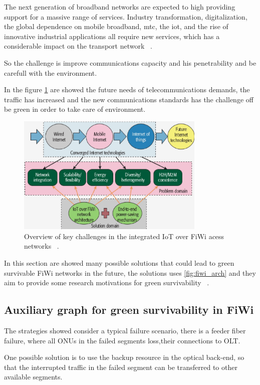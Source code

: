 \documentclass[conference,compsoc]{IEEEtran}
\begin{document}
The next generation of broadband networks are expected to  high providing support for a massive 
range of services. Industry transformation, digitalization, the global dependence on mobile 
broadband, mtc, the iot, and the rise of innovative industrial applications all require new 
services, which has a considerable impact on the transport network ~\cite{5greview}.

So the challenge is improve communications capacity and his penetrability and be carefull with the 
environment.

In the figure \ref{fig:fiwi_iot} are showed the future needs of telecommunications demands, the traffic has increased and the new communications standards has the challenge off be green in order to take care of environment.

\begin{figure}[H]
 	\includegraphics[width=9cm]{future.eps}
 	\caption{Overview of key challenges in the integrated IoT over FiWi acess networks ~\cite{iot_fiwi}.}
 	\label{fig:fiwi_iot}
\end{figure}

In this section are showed many possible solutions that could lead to green survivable FiWi networks in the future, the solutions uses \ref{fig:fiwi_arch} and they aim to provide some research motivations for green survivability ~\cite{Liu201268}.

\subsection{Auxiliary graph for green survivability in FiWi}
 The strategies showed consider a typical failure scenario, there is a feeder fiber failure, 
where all ONUs in the failed segments loss,their connections to OLT.

One possible solution is to use the backup resource in the optical back-end, so that the 
interrupted traffic in the failed segment can be transferred to other available segments.
\end{document}
